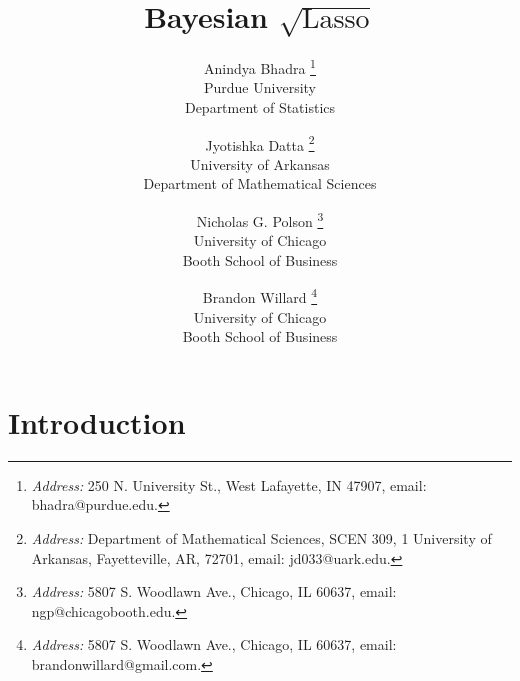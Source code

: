 \documentclass[12pt]{article}
\begin{document}

\title{Bayesian $\sqrt{\text{Lasso}}$}

\author{Anindya Bhadra  \footnote{{\em Address:} 250 N. University St., West Lafayette, IN 47907, email: bhadra@purdue.edu.} \\ Purdue University \\ Department of Statistics 
\and Jyotishka Datta  \footnote{{\em Address:} Department of Mathematical Sciences, SCEN 309, 1 University of Arkansas, Fayetteville, AR, 72701, email: jd033@uark.edu.}\\ University of Arkansas \\ Department of Mathematical Sciences 
\and Nicholas G. Polson \footnote{{\em Address:} 5807 S. Woodlawn Ave., Chicago, IL 60637, email: ngp@chicagobooth.edu.} \\ University of Chicago \\ Booth School of
Business \and Brandon Willard \footnote{{\em Address:} 5807 S. Woodlawn Ave., Chicago, IL 60637, email: brandonwillard@gmail.com.} \\ University of Chicago \\ Booth School of
Business}

\maketitle


\section{Introduction}
\end{document}
